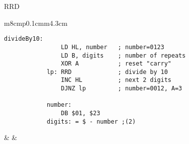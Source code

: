 \documentclass[12pt,twoside,openright,a4paper]{book}
\begin{document}
\begin{basedescript}{
	\desclabelstyle{\multilinelabel}
	\desclabelwidth{3cm}}
\begin{DetailItem}{RRD}
		\begin{tabular}{m{8cm}p{0.1cm}m{4.3cm}}

			\begin{lstlisting}[autogobble=true, belowskip=0pt]
			divideBy10:
				LD HL, number	; number=0123
				LD B, digits	; number of repeats
				XOR A			; reset "carry"
			lp:	RRD				; divide by 10 
				INC HL			; next 2 digits
				DJNZ lp			; number=0012, A=3

			number:
				DB $01, $23
			digits: = $ - number ;(2)
			\end{lstlisting}
	
			& &
   	
			\newcommand{\HLindicator}[2]{
				\path (progress-#1-2.south west) --
					node[xshift=#2, yshift=1.4ex, rotate=90]{$\lbrace$}
					node[xshift=#2 + 0.1ex, yshift=0.2ex, indicator]{(HL)} (progress-#1-2.south)
			}

			\newcommand{\ByteIndicator}[1]{
				\draw 
					(progress-#1-2.west) ++(8.5pt,9pt) 
					|- ++(5pt,-3pt) -| ++(6pt,3pt) 
					++(1pt,0) 
					|- ++(5pt,-3pt) -| ++(6pt,3pt);
			}
	
\end{tabular}
\end{DetailItem}
\end{basedescript}
\end{document}
